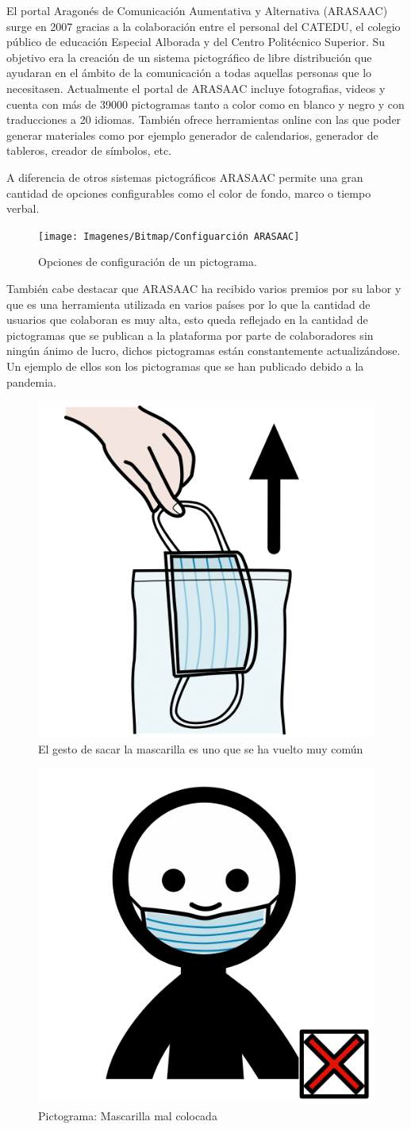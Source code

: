 El portal Aragonés de Comunicación Aumentativa y Alternativa (ARASAAC) surge en 2007 gracias a la colaboración entre el personal del CATEDU, el colegio público de educación Especial Alborada y del Centro Politécnico Superior. Su objetivo era la creación de un sistema pictográfico de libre distribución que ayudaran en el ámbito de la comunicación a todas aquellas personas que lo necesitasen.
Actualmente el portal de ARASAAC incluye fotografias, videos y cuenta con más de 39000 pictogramas tanto a color como en blanco y negro y con traducciones a 20 idiomas. También ofrece herramientas online con las que poder generar materiales como por ejemplo generador de calendarios, generador de tableros, creador de símbolos, etc.

A diferencia de otros sistemas pictográficos ARASAAC permite una gran cantidad de opciones configurables como el color de fondo, marco o tiempo verbal.


\begin{figure}[h!]
	\centering
	\texttt{[image: Imagenes/Bitmap/Configuarción ARASAAC]}
	\caption{Opciones de configuración de un pictograma.}
	\label{fig:configuarcion-arasaac}
\end{figure}



También cabe destacar que ARASAAC ha recibido varios premios por su labor y que es una herramienta utilizada en varios países por lo que la cantidad de usuarios que colaboran es muy alta, esto queda reflejado en la cantidad de pictogramas que se publican a la plataforma por parte de colaboradores sin ningún ánimo de lucro, dichos pictogramas están constantemente actualizándose. Un ejemplo de ellos son los pictogramas que se han publicado debido a la pandemia.

\begin{figure}[h!]
	\centering
	\includegraphics[width=0.2\linewidth]{Imagenes/Bitmap/Picto Mascarilla}
	\caption{El gesto de sacar la mascarilla es uno que se ha vuelto muy común}
	\label{fig:picto-mascarilla}
\end{figure}

\begin{figure}[h!]
	\centering
	\includegraphics[width=0.2\linewidth]{Imagenes/Bitmap/Mascarilla mal colocada}
	\caption{Pictograma: Mascarilla mal colocada}
	\label{fig:picto-mascarilla-mal-colocada}
\end{figure}

